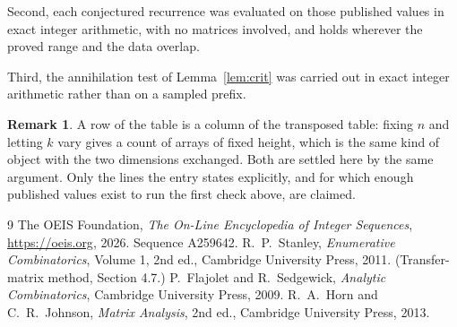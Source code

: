 \documentclass[11pt,a4paper]{article}
\theoremstyle{plain}
\theoremstyle{definition}
\newtheorem{remark}[theorem]{Remark}
\begin{document}
Second, each conjectured recurrence was evaluated on those published values in exact
integer arithmetic, with no matrices involved, and holds wherever the proved range and the
data overlap.

Third, the annihilation test of Lemma~\ref{lem:crit} was carried out in exact integer
arithmetic rather than on a sampled prefix.

\begin{remark}
A row of the table is a column of the transposed table: fixing $n$ and letting $k$ vary gives a
count of arrays of fixed height, which is the same kind of object with the two dimensions
exchanged. Both are settled here by the same argument. Only the lines the entry states
explicitly, and for which enough published values exist to run the first check above, are
claimed.
\end{remark}

\begin{thebibliography}{9}
 The OEIS Foundation, \emph{The On-Line Encyclopedia of Integer
Sequences}, \url{https://oeis.org}, 2026. Sequence A259642.
 R.~P.~Stanley, \emph{Enumerative Combinatorics}, Volume 1, 2nd ed.,
Cambridge University Press, 2011. (Transfer-matrix method, Section 4.7.)
 P.~Flajolet and R.~Sedgewick, \emph{Analytic Combinatorics}, Cambridge
University Press, 2009.
 R.~A.~Horn and C.~R.~Johnson, \emph{Matrix Analysis}, 2nd ed., Cambridge
University Press, 2013.
\end{thebibliography}
\end{document}
